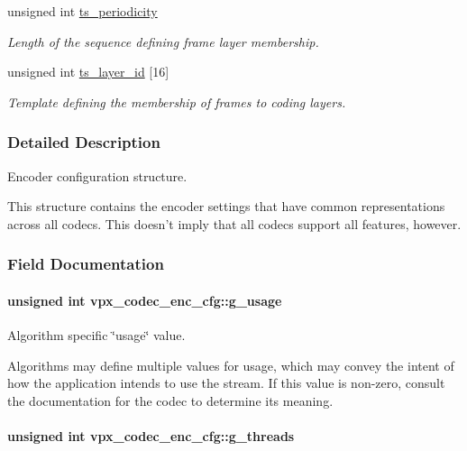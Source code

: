 \begin{DoxyCompactItemize}
unsigned int \hyperlink{structvpx__codec__enc__cfg_a4ec338780115dd270acf0dac24193474}{ts\+\_\+periodicity}
\begin{DoxyCompactList}\small\item\em Length of the sequence defining frame layer membership. \end{DoxyCompactList}\item 
unsigned int \hyperlink{structvpx__codec__enc__cfg_a4d105d2470dbfb7210b33d298f1cf1f6}{ts\+\_\+layer\+\_\+id} \mbox{[}16\mbox{]}
\begin{DoxyCompactList}\small\item\em Template defining the membership of frames to coding layers. \end{DoxyCompactList}\end{DoxyCompactItemize}


\subsubsection{Detailed Description}
Encoder configuration structure. 

This structure contains the encoder settings that have common representations across all codecs. This doesn't imply that all codecs support all features, however. 

\subsubsection{Field Documentation}
\hypertarget{structvpx__codec__enc__cfg_a5bcf7fc1efc4890de351e3c6fe252355}{
\paragraph[{g\+\_\+usage}]{\setlength{\rightskip}{0pt plus 5cm}unsigned int vpx\+\_\+codec\+\_\+enc\+\_\+cfg\+::g\+\_\+usage}}\label{structvpx__codec__enc__cfg_a5bcf7fc1efc4890de351e3c6fe252355}


Algorithm specific \char`\"{}usage\char`\"{} value. 

Algorithms may define multiple values for usage, which may convey the intent of how the application intends to use the stream. If this value is non-\/zero, consult the documentation for the codec to determine its meaning. \hypertarget{structvpx__codec__enc__cfg_aff9d8d458c45c95dd542603210ba2b8b}{
\paragraph[{g\+\_\+threads}]{\setlength{\rightskip}{0pt plus 5cm}unsigned int vpx\+\_\+codec\+\_\+enc\+\_\+cfg\+::g\+\_\+threads}}\label{structvpx__codec__enc__cfg_aff9d8d458c45c95dd542603210ba2b8b}


